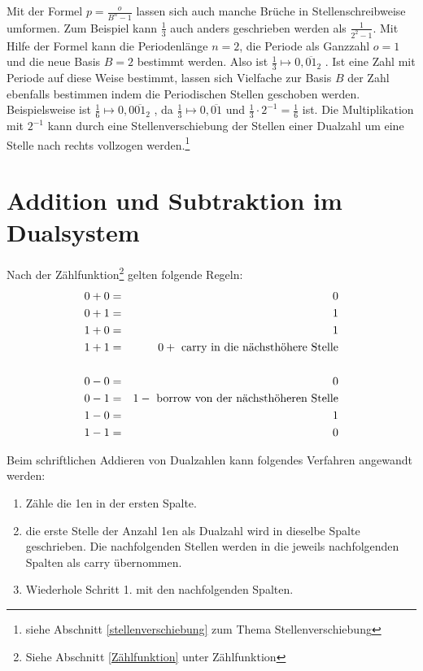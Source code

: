 Mit der Formel $p = \frac{o}{B^n - 1}$ lassen sich auch manche Brüche in Stellenschreibweise umformen. Zum Beispiel kann $\frac{1}{3}$ auch anders geschrieben werden als $\frac{1}{2^2 - 1}$. Mit Hilfe der Formel kann die Periodenlänge $n = 2$, die Periode als Ganzzahl $o = 1$ und die neue Basis $B = 2$ bestimmt werden. Also ist $\frac{1}{3} \mapsto 0,\overline{01}_2$ .
Ist eine Zahl mit Periode auf diese Weise bestimmt, lassen sich Vielfache zur Basis $B$ der Zahl ebenfalls bestimmen indem die Periodischen Stellen geschoben werden. Beispielsweise ist $ \frac{1}{6} \mapsto 0,0 \overline{01}_2 $ , da $\frac{1}{3} \mapsto 0, \overline{01} $ und $ \frac{1}{3} \cdot 2^{-1} = \frac{1}{6}$ ist. Die Multiplikation mit $2^{-1}$ kann durch eine Stellenverschiebung der Stellen einer Dualzahl um eine Stelle nach rechts vollzogen werden.\footnote{siehe Abschnitt \ref{stellenverschiebung} zum Thema Stellenverschiebung}  

\section{Addition und Subtraktion im Dualsystem}
Nach der Zählfunktion\footnote{Siehe Abschnitt \ref{Zählfunktion} unter Zählfunktion} gelten folgende Regeln:
\begin{eqnarray*}
	0 + 0 & = & 0 \\
	0 + 1 & = & 1 \\
	1 + 0 & = & 1 \\
	1 + 1 & = & 0 +\textnormal{ carry in die nächsthöhere Stelle}\\ 
	\\
	0 - 0 & = & 0 \\
	0 - 1 & = & 1 -\textnormal{ borrow von der nächsthöheren Stelle}\\
	1 - 0 & = & 1 \\
	1 - 1 & = & 0 \\ 
\end{eqnarray*}

Beim schriftlichen Addieren von Dualzahlen kann folgendes Verfahren angewandt werden:
\begin{enumerate}
\item
	Zähle die 1en in der ersten Spalte.
\item
	die erste Stelle der Anzahl 1en als Dualzahl wird in dieselbe Spalte geschrieben. Die nachfolgenden Stellen werden in die jeweils nachfolgenden Spalten als carry übernommen.
\item
	Wiederhole Schritt 1. mit den nachfolgenden Spalten.
\end{enumerate}

